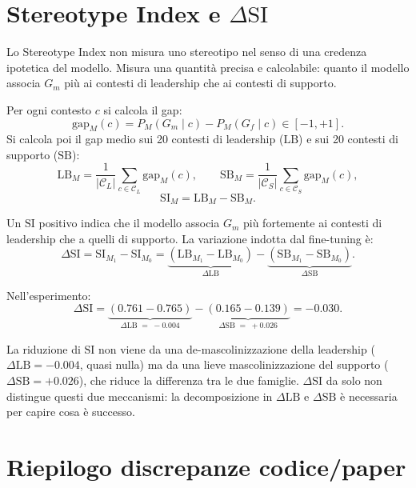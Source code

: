 \documentclass[11pt,a4paper]{article}
\newcommand{\M}[1]{M_{#1}}
\newcommand{\Gm}{G_m}
\newcommand{\Gf}{G_f}
\begin{document}
\section{Stereotype Index e \texorpdfstring{$\Delta\mathrm{SI}$}{DeltaSI}}

Lo Stereotype Index non misura uno stereotipo nel senso di una credenza ipotetica
del modello. Misura una quantità precisa e calcolabile: quanto il modello associa
$\Gm$ più ai contesti di leadership che ai contesti di supporto.

Per ogni contesto $c$ si calcola il gap:
\[
  \mathrm{gap}_M(c) = P_M(\Gm \mid c) - P_M(\Gf \mid c) \in [-1, +1].
\]
Si calcola poi il gap medio sui 20 contesti di leadership ($\mathrm{LB}$)
e sui 20 contesti di supporto ($\mathrm{SB}$):
\[
  \mathrm{LB}_M = \frac{1}{|\mathcal{C}_L|}\sum_{c \in \mathcal{C}_L} \mathrm{gap}_M(c),
  \qquad
  \mathrm{SB}_M = \frac{1}{|\mathcal{C}_S|}\sum_{c \in \mathcal{C}_S} \mathrm{gap}_M(c),
\]
\[
  \mathrm{SI}_M = \mathrm{LB}_M - \mathrm{SB}_M.
\]

Un $\mathrm{SI}$ positivo indica che il modello associa $\Gm$ più fortemente
ai contesti di leadership che a quelli di supporto.
La variazione indotta dal fine-tuning è:
\[
  \Delta\mathrm{SI} = \mathrm{SI}_{\M{1}} - \mathrm{SI}_{\M{0}}
  = \underbrace{(\mathrm{LB}_{\M{1}} - \mathrm{LB}_{\M{0}})}_{\Delta\mathrm{LB}}
  - \underbrace{(\mathrm{SB}_{\M{1}} - \mathrm{SB}_{\M{0}})}_{\Delta\mathrm{SB}}.
\]

Nell'esperimento:
\[
  \Delta\mathrm{SI}
  = \underbrace{(0.761 - 0.765)}_{\Delta\mathrm{LB}\;=\;-0.004}
  - \underbrace{(0.165 - 0.139)}_{\Delta\mathrm{SB}\;=\;+0.026}
  = -0.030.
\]

La riduzione di $\mathrm{SI}$ non viene da una de-mascolinizzazione della leadership
($\Delta\mathrm{LB} = -0.004$, quasi nulla) ma da una lieve mascolinizzazione
del supporto ($\Delta\mathrm{SB} = +0.026$), che riduce la differenza tra le due famiglie.
$\Delta\mathrm{SI}$ da solo non distingue questi due meccanismi: la decomposizione
in $\Delta\mathrm{LB}$ e $\Delta\mathrm{SB}$ è necessaria per capire cosa è successo.

\section{Riepilogo discrepanze codice/paper}
\end{document}
